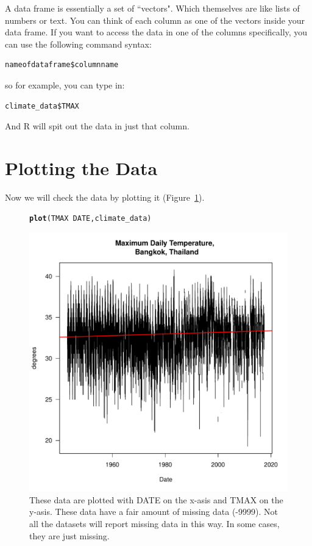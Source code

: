 \documentclass{article}\usepackage[]{graphicx}\usepackage[]{color}
\makeatletter
\def\maxwidth{ %
  \ifdim\Gin@nat@width>\linewidth
    \linewidth
  \else
    \Gin@nat@width
  \fi
}
\newcommand{\hlopt}[1]{\textcolor[rgb]{0,0,0}{#1}}%
\newcommand{\hlstd}[1]{\textcolor[rgb]{0.345,0.345,0.345}{#1}}%
\newcommand{\hlkwd}[1]{\textcolor[rgb]{0.737,0.353,0.396}{\textbf{#1}}}%
\newenvironment{kframe}{%
 \def\at@end@of@kframe{}%
 \ifinner\ifhmode%
  \def\at@end@of@kframe{\end{minipage}}%
  \begin{minipage}{\columnwidth}%
 \fi\fi%
 \def\FrameCommand##1{\hskip\@totalleftmargin \hskip-\fboxsep
 \colorbox{shadecolor}{##1}\hskip-\fboxsep
     \hskip-\linewidth \hskip-\@totalleftmargin \hskip\columnwidth}%
 \MakeFramed {\advance\hsize-\width
   \@totalleftmargin\z@ \linewidth\hsize
   \@setminipage}}%
 {\par\unskip\endMakeFramed%
 \at@end@of@kframe}
\newenvironment{knitrout}{}{} %
\makeatother
\begin{document}
A data frame is essentially a set of ``vectors". Which themselves are like lists of numbers or text. You can think of each column as one of the vectors inside your data frame. If you want to access the data in one of the columns specifically, you can use the following command syntax:

\begin{verbatim}
nameofdataframe$columnname
\end{verbatim}

so for example, you can type in:

\begin{verbatim}
climate_data$TMAX
\end{verbatim}

And R will spit out the data in just that column. 

\section{Plotting the Data}

Now we will check the data by plotting it (Figure~\ref{fig:plotmissing}). 

\begin{figure}
\begin{knitrout}
\color{fgcolor}\begin{kframe}
\begin{alltt}
\hlkwd{plot}\hlstd{(TMAX}\hlopt{~}\hlstd{DATE, climate_data)}
\end{alltt}
\end{kframe}
\includegraphics[width=\maxwidth]{figure/unnamed-chunk-5-1} 

\end{knitrout}
\caption{These data are plotted with DATE on the x-asis and TMAX on the y-asis. These data have a fair amount of missing data (-9999). Not all the datasets will report missing data in this way. In some cases, they are just missing.}
\label{fig:plotmissing}
\end{figure}
\end{document}
